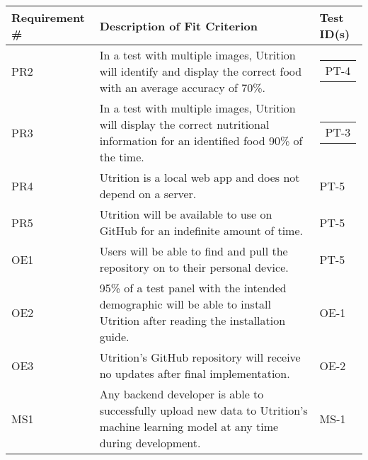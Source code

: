 \documentclass[12pt, titlepage]{article}
\begin{document}
	
	\begin{table}[H]
		\begin{tabularx}{\textwidth}{|l|X|l|}
			\hline
			{\bf Requirement \#} & {\bf Description of Fit Criterion} & {\bf Test ID(s)}\\
			\hline
			PR2 & In a test with multiple images, Utrition will identify and 
			display the correct food with an average accuracy of 70\%. & 
			\begin{tabular}[c]{@{}l@{}} PT-4 \end{tabular}\\
			\hline
			PR3 & In a test with multiple images, Utrition will display the 
			correct nutritional information for an identified food 90\% of the 
			time. & \begin{tabular}[c]{@{}l@{}}PT-3 \end{tabular}\\
			\hline
			PR4 & Utrition is a local web app and does not depend on a server. & PT-5\\
			\hline
			PR5 & Utrition will be available to use on GitHub for an indefinite amount of time. & PT-5\\
			\hline
			OE1 & Users will be able to find and pull the repository on to their personal device. & PT-5\\
			\hline
			OE2 & 95\% of a test panel with the intended demographic will be able to install Utrition after reading the installation guide. & OE-1\\
			\hline
			OE3 & Utrition’s GitHub repository will receive no updates after final implementation. & OE-2\\
			\hline
			MS1 & Any backend developer is able to successfully upload new data to Utrition’s machine learning model at any time during development.  & MS-1\\
			\hline
		\end{tabularx}
	\end{table}
\end{document}
